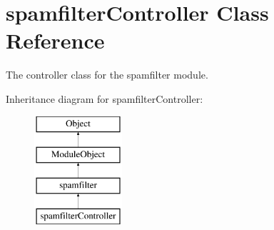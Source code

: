 \hypertarget{classspamfilterController}{\section{spamfilter\-Controller Class Reference}
\label{classspamfilterController}
}


The controller class for the spamfilter module.  


Inheritance diagram for spamfilter\-Controller\-:\begin{figure}[H]
\begin{center}
\leavevmode
\includegraphics[height=4.000000cm]{classspamfilterController}
\end{center}
\end{figure}

